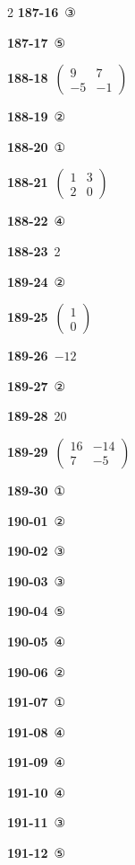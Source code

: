 \documentclass[10pt,a4paper]{article}
\begin{document}
\begin{multicols}{2}
\noindent\textbf{187-16}\ ③\par
\noindent\textbf{187-17}\ ⑤\par
\noindent\textbf{188-18}\ $\begin{pmatrix} 9 & 7 \\ -5 & -1 \end{pmatrix}$\par
\noindent\textbf{188-19}\ ②\par
\noindent\textbf{188-20}\ ①\par
\noindent\textbf{188-21}\ $\begin{pmatrix} 1 & 3 \\ 2 & 0 \end{pmatrix}$\par
\noindent\textbf{188-22}\ ④\par
\noindent\textbf{188-23}\ 2\par
\noindent\textbf{189-24}\ ②\par
\noindent\textbf{189-25}\ $\begin{pmatrix} 1 \\ 0 \end{pmatrix}$\par
\noindent\textbf{189-26}\ $-12$\par
\noindent\textbf{189-27}\ ②\par
\noindent\textbf{189-28}\ 20\par
\noindent\textbf{189-29}\ $\begin{pmatrix} 16 & -14 \\ 7 & -5 \end{pmatrix}$\par
\noindent\textbf{189-30}\ ①\par
\noindent\textbf{190-01}\ ②\par
\noindent\textbf{190-02}\ ③\par
\noindent\textbf{190-03}\ ③\par
\noindent\textbf{190-04}\ ⑤\par
\noindent\textbf{190-05}\ ④\par
\noindent\textbf{190-06}\ ②\par
\noindent\textbf{191-07}\ ①\par
\noindent\textbf{191-08}\ ④\par
\noindent\textbf{191-09}\ ④\par
\noindent\textbf{191-10}\ ④\par
\noindent\textbf{191-11}\ ③\par
\noindent\textbf{191-12}\ ⑤\par

\end{multicols}
\end{document}
